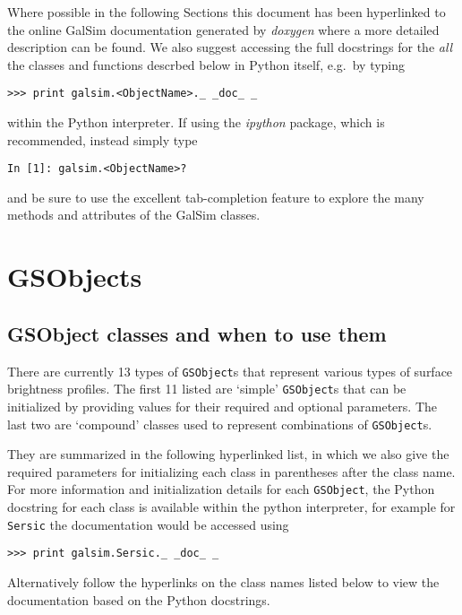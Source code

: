 \documentclass[preprint,11pt]{aastex}
\begin{document}
Where possible in the following Sections this document has been hyperlinked to the online
GalSim documentation generated by \emph{doxygen} where a more detailed
description can be found.  We also suggest accessing the full docstrings for the \emph{all} the
classes and functions descrbed below in Python itself, e.g.\ by typing

{\tt >>> print galsim.<ObjectName>.\_\,\_doc\_\,\_}

within the Python interpreter.  If using the \emph{ipython} package,
which is recommended, instead simply type

{\tt In [1]: galsim.<ObjectName>?}

and be sure to use the excellent tab-completion feature to explore the many
methods and attributes of the GalSim classes.

\newpage

\section{GSObjects}\label{sect:gsobjects}

\subsection{GSObject classes and when to use them}\label{sect:gsobjectclasses}
There are currently 13 types of \texttt{GSObject}s that represent various types of surface brightness
profiles. The first 11 listed are 
`simple' \texttt{GSObject}s that can be initialized by providing values for
their required and optional parameters.  The last two are `compound'
classes used to represent combinations of \texttt{GSObject}s.  

They are summarized in the following hyperlinked list, in which we also give
the required parameters for initializing each class in parentheses
after the class name.  For more information and initialization details for each \texttt{GSObject},
the Python docstring for each class is available within the python interpreter, for example for
\texttt{Sersic} the documentation would be accessed using 

{\tt >>> print galsim.Sersic.\_\,\_doc\_\,\_}

Alternatively follow the hyperlinks on
the class names listed below to view the documentation based
on the Python docstrings.
\end{document}
